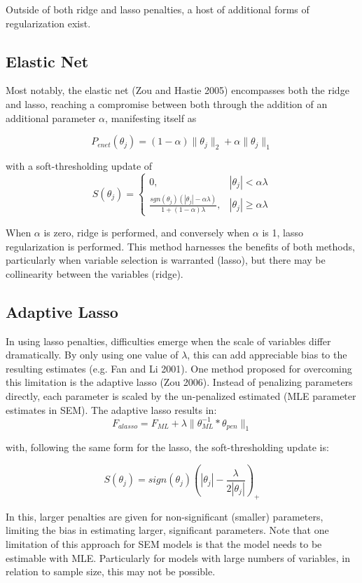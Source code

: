 \documentclass[article]{jss}
\begin{document}
Outside of both ridge and lasso penalties, a host of additional forms of
regularization exist.

\subsection{Elastic Net}\label{elastic-net}

Most notably, the elastic net (Zou and Hastie 2005) encompasses both the
ridge and lasso, reaching a compromise between both through the addition
of an additional parameter \(\alpha\), manifesting itself as

\[
P_{enet}(\theta_{j}) = (1-\alpha)\| \theta_{j} \|_{2} + \alpha\| \theta_{j} \|_{1}
\]

with a soft-thresholding update of \[
S(\theta_{j})= 
\begin{cases}
0,&  |\theta_{j}| < \alpha\lambda\\
\frac{sgn(\theta_{j})(|\theta_{j}|-\alpha\lambda)}{1+(1-\alpha)\lambda},              & |\theta_{j}|\geq\alpha\lambda
\end{cases}
\]

When \(\alpha\) is zero, ridge is performed, and conversely when
\(\alpha\) is 1, lasso regularization is performed. This method
harnesses the benefits of both methods, particularly when variable
selection is warranted (lasso), but there may be collinearity between
the variables (ridge).

\subsection{Adaptive Lasso}\label{adaptive-lasso}

In using lasso penalties, difficulties emerge when the scale of
variables differ dramatically. By only using one value of \(\lambda\),
this can add appreciable bias to the resulting estimates (e.g. Fan and
Li 2001). One method proposed for overcoming this limitation is the
adaptive lasso (Zou 2006). Instead of penalizing parameters directly,
each parameter is scaled by the un-penalized estimated (MLE parameter
estimates in SEM). The adaptive lasso results in: \[
F_{alasso} = F_{ML} + \lambda \| \theta_{ML}^{-1} * \theta_{pen} \|_{1}
\]

with, following the same form for the lasso, the soft-thresholding
update is:

\[
S(\theta_{j})= sign(\theta_{j})(|\theta_{j}|-\frac{\lambda}{2|\theta_{j}|})_{+}
\]

In this, larger penalties are given for non-significant (smaller)
parameters, limiting the bias in estimating larger, significant
parameters. Note that one limitation of this approach for SEM models is
that the model needs to be estimable with MLE. Particularly for models
with large numbers of variables, in relation to sample size, this may
not be possible.
\end{document}
